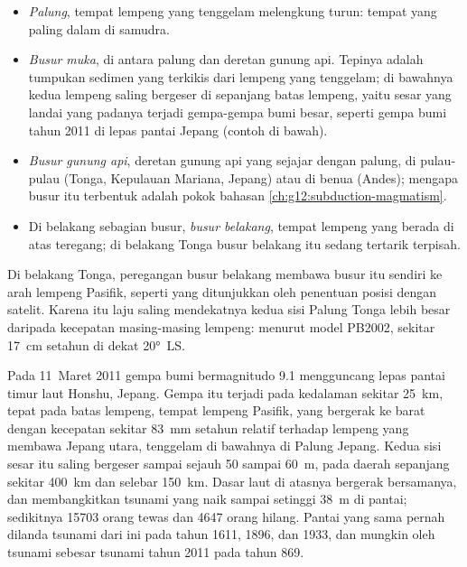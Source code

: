 \begin{itemize}
  \item \emph{Palung}, tempat lempeng yang tenggelam melengkung turun: tempat
        yang paling dalam di samudra.
  \item \emph{Busur muka}, di antara palung dan deretan gunung api. Tepinya
        adalah tumpukan sedimen yang terkikis dari lempeng yang tenggelam; di
        bawahnya kedua lempeng saling bergeser di sepanjang batas lempeng, yaitu
        sesar yang landai yang padanya terjadi gempa-gempa bumi besar, seperti
        gempa bumi tahun 2011 di lepas pantai Jepang (contoh di bawah).
  \item \emph{Busur gunung api}, deretan gunung api yang sejajar dengan palung,
        di pulau-pulau (Tonga, Kepulauan Mariana, Jepang) atau di benua (Andes);
        mengapa busur itu terbentuk adalah pokok bahasan
        \cref{ch:g12:subduction-magmatism}.
  \item Di belakang sebagian busur, \emph{busur belakang}, tempat lempeng yang
        berada di atas teregang; di belakang Tonga busur belakang itu sedang
        tertarik terpisah.
\end{itemize}

Di belakang Tonga, peregangan busur belakang membawa busur itu sendiri ke arah
lempeng Pasifik, seperti yang ditunjukkan oleh penentuan posisi dengan satelit. Karena itu laju saling mendekatnya kedua sisi Palung Tonga
lebih besar daripada kecepatan masing-masing lempeng: menurut model PB2002,
sekitar \qty{17}{cm} setahun di dekat \ang{20}~LS.

\begin{example}\label{ex:g11:subduction-zones:tohoku}
Pada 11~Maret 2011 gempa bumi bermagnitudo 9.1 mengguncang lepas pantai
timur laut Honshu, Jepang. Gempa itu terjadi pada kedalaman sekitar \qty{25}{km},
tepat pada batas lempeng, tempat lempeng Pasifik, yang bergerak ke barat dengan
kecepatan sekitar \qty{83}{mm} setahun relatif terhadap lempeng yang membawa
Jepang utara, tenggelam di bawahnya di Palung Jepang. Kedua sisi sesar itu
saling bergeser sampai sejauh 50 sampai \qty{60}{m}, pada daerah sepanjang sekitar
\qty{400}{km} dan selebar \qty{150}{km}. Dasar laut di atasnya bergerak
bersamanya, dan membangkitkan tsunami yang naik sampai setinggi \qty{38}{m} di
pantai; sedikitnya \num{15703} orang tewas dan \num{4647} orang hilang. Pantai
yang sama pernah dilanda tsunami dari  ini pada tahun 1611, 1896,
dan 1933, dan mungkin oleh tsunami sebesar tsunami tahun 2011 pada tahun 869.
\end{example}


